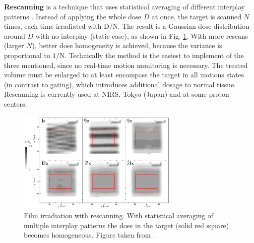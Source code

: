 \textbf{Rescanning} is a technique that uses statistical averaging of different interplay patterns \cite{Phillips1992}. Instead of applying the whole dose $D$ at once, the target is scanned $N$ times, each
time irradiated with $\mathrm{D}/\mathrm{N}$. The result is a Gaussian dose distribution around $D$ with no interplay (static case), as shown in Fig. \ref{rescanning}. With more rescans (larger $N$), better dose homogeneity is achieved, because the variance is proportional
to $\mathrm{1}/\mathrm{N}$. Technically the method is the easiest to implement of the three mentioned, since no real-time motion monitoring is necessary. The treated volume must be enlarged to at least encompass the target in all motions states (in
contrast to gating), which introduces additional dosage to normal tissue. Rescanning is currently used at NIRS, Tokyo (Japan) and at some proton centers.
\newline
\begin{figure}[H]
\begin{center}
\includegraphics[width=0.7\textwidth]{./Fundamentals/Images/rescanning.png}
\caption{Film irradiation with rescanning. With statistical averaging of multiple interplay patterns the dose in the target (solid red square) becomes homogeneous. Figure taken from \cite{Bert2009}.}
\label{rescanning}
\end{center}
\end{figure}

